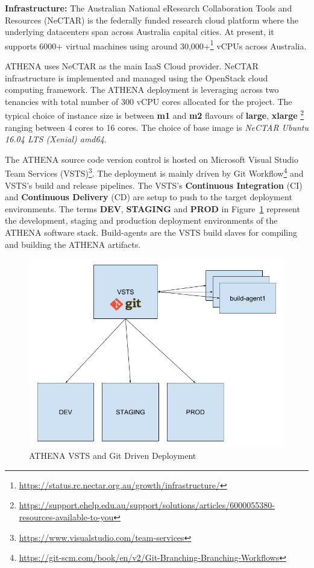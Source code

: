 \noindent \textbf{Infrastructure:} \quad The Australian National eResearch Collaboration Tools and Resources (NeCTAR) is the federally funded research cloud platform where the underlying datacenters span across Australia capital cities. At present, it supports 6000+ virtual machines using around 30,000+\footnote{\url{https://status.rc.nectar.org.au/growth/infrastructure/}} vCPUs across Australia.

ATHENA uses NeCTAR as the main IaaS Cloud provider. NeCTAR infrastructure is implemented and managed using the OpenStack cloud computing framework. The ATHENA deployment is leveraging across two tenancies with total number of 300 vCPU cores allocated for the project. The typical choice of instance size is between \textbf{m1} and \textbf{m2} flavours of \textbf{large}, \textbf{xlarge} \footnote{\url{https://support.ehelp.edu.au/support/solutions/articles/6000055380-resources-available-to-you}} ranging between 4 cores to 16 cores. The choice of base image is \textit{NeCTAR Ubuntu 16.04 LTS (Xenial) amd64}.

The ATHENA source code version control is hosted on Microsoft Visual Studio Team Services (VSTS)\footnote{\url{https://www.visualstudio.com/team-services}}. The deployment is mainly driven by Git Workflow\footnote{\url{https://git-scm.com/book/en/v2/Git-Branching-Branching-Workflows}} and VSTS's build and release pipelines. The VSTS's \textbf{Continuous Integration} (CI) and \textbf{Continuous Delivery} (CD) \parencite{httermann2012devops} are setup to push to the target deployment environments. The terms \textbf{DEV}, \textbf{STAGING} and \textbf{PROD} in Figure~\ref{fig:deployVSTS} represent the development, staging and production deployment environments of the ATHENA software stack. Build-agents are the VSTS build slaves for compiling and building the ATHENA artifacts.

\begin{figure}[H]
\centering
\includegraphics[width=0.3\paperwidth]{Figures/ATHENA_deploy_vsts}
\decoRule
\caption[ATHENA VSTS and Git]{ATHENA VSTS and Git Driven Deployment}
\label{fig:deployVSTS}
\end{figure}

